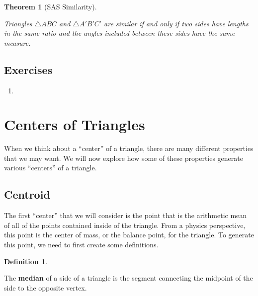 \documentclass[
]{book}
\providecommand{\tightlist}{%
  \setlength{\itemsep}{0pt}\setlength{\parskip}{0pt}}
\newtheorem{theorem}{Theorem}[chapter]
\theoremstyle{definition}
\newtheorem{definition}{Definition}[chapter]
\theoremstyle{definition}
\theoremstyle{definition}
\theoremstyle{definition}
\theoremstyle{remark}
\begin{document}
\begin{theorem}[SAS Similarity]
\protect\hypertarget{thm:SAS-similarity}{}\label{thm:SAS-similarity}

Triangles \(\triangle ABC\) and \(\triangle A'B'C'\) are similar if and only if two sides have lengths in the same ratio and the angles included between these sides have the same measure.

\end{theorem}

\hypertarget{exercises-40}{%
\subsection{Exercises}\label{exercises-40}}

\begin{enumerate}
\def\labelenumi{\arabic{enumi}.}
\tightlist
\item
\end{enumerate}

\hypertarget{centers-of-triangles}{%
\section{Centers of Triangles}\label{centers-of-triangles}}

When we think about a ``center'' of a triangle, there are many different properties that we may want. We will now explore how some of these properties generate various ``centers'' of a triangle.

\hypertarget{centroid}{%
\subsection{Centroid}\label{centroid}}

The first ``center'' that we will consider is the point that is the arithmetic mean of all of the points contained inside of the triangle. From a physics perspective, this point is the center of mass, or the balance point, for the triangle. To generate this point, we need to first create some definitions.

\begin{definition}
\protect\hypertarget{def:unlabeled-div-179}{}\label{def:unlabeled-div-179}

The \textbf{median} of a side of a triangle is the segment connecting the midpoint of the side to the opposite vertex.

\end{definition}
\end{document}
